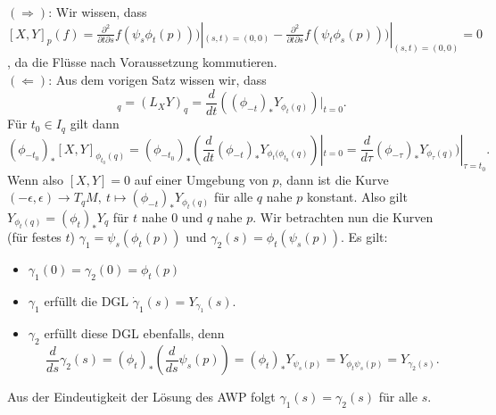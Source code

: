 \begin{beweis}
$(\Rightarrow)$: Wir wissen, dass $[X,Y]_p(f)=\frac{\partial^2}{\partial t \partial s} f(\psi_s \phi_t (p)))|_{(s,t)=(0,0)} - \frac{\partial^2}{\partial t \partial s} f(\psi_t \phi_s (p)))|_{(s,t)=(0,0)} =0$, da die Flüsse nach Voraussetzung kommutieren.\\
$(\Leftarrow)$: Aus dem vorigen Satz wissen wir, dass 
\begin{equation}
[X, Y]_q = (L_XY)_q = \frac{d}{dt} ((\phi_{-t})_\ast Y_{\phi_t(q)})|_{t=0}.
\end{equation}
Für $t_0 \in I_q$ gilt dann
\begin{equation}
(\phi_{-t_0})_\ast [X,Y]_{\phi_{t_0}(q)} = (\phi_{-t_0})_\ast \left( \frac{d}{dt} (\phi_{-t})_\ast Y_{\phi_t(\phi_{t_0}(q)} \right)|_{t=0} = \frac{d}{d \tau} (\phi_{-\tau})_\ast Y_{\phi_\tau(q)})|_{\tau = t_0}.
\end{equation}
Wenn also $[X,Y]=0$ auf einer Umgebung von $p$, dann ist die Kurve $(-\epsilon, \epsilon) \to T_qM, \ t \mapsto (\phi_{-t})_\ast Y_{\phi_t(q)}$ für alle $q$ nahe $p$ konstant. Also gilt $Y_{\phi_t(q)} = (\phi_t)_\ast Y_q$ für $t$ nahe $0$ und $q$ nahe $p$. Wir betrachten nun die Kurven (für festes $t$) $\gamma_1 = \psi_s(\phi_t (p))$ und $\gamma_2 (s) = \phi_t (\psi_s (p))$. Es gilt: 
\begin{itemize}
\item $\gamma_1(0) = \gamma_2(0) = \phi_t(p)$
\item $\gamma_1$ erfüllt die DGL $\dot{\gamma}_1(s)=Y_{\gamma_1}(s)$.
\item $\gamma_2$ erfüllt diese DGL ebenfalls, denn 
\begin{equation}
\frac{d}{ds} \gamma_2(s) = (\phi_t)_\ast (\frac{d}{ds} \psi_s(p)) = (\phi_t)_\ast Y_{\psi_s(p)} = Y_{\phi_t\psi_s (p)} = Y_{\gamma_2(s)}.
\end{equation}
\end{itemize}
Aus der Eindeutigkeit der Lösung des AWP folgt $\gamma_1 (s) =  \gamma_2(s)$ für alle $s$.
\end{beweis}
